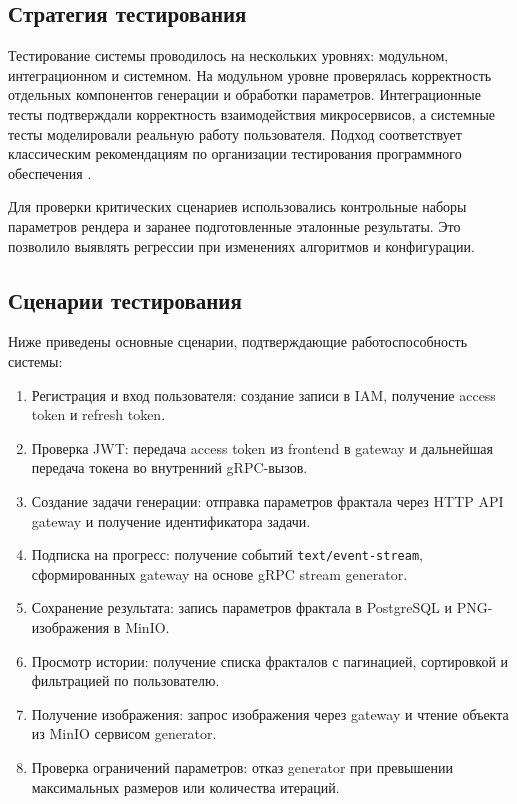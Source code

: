 \subsection{Стратегия тестирования}

Тестирование системы проводилось на нескольких уровнях: модульном, интеграционном и системном. На модульном уровне проверялась корректность отдельных компонентов генерации и обработки параметров. Интеграционные тесты подтверждали корректность взаимодействия микросервисов, а системные тесты моделировали реальную работу пользователя. Подход соответствует классическим рекомендациям по организации тестирования программного обеспечения \cite{testing_myers}.

Для проверки критических сценариев использовались контрольные наборы параметров рендера и заранее подготовленные эталонные результаты. Это позволило выявлять регрессии при изменениях алгоритмов и конфигурации.

\subsection{Сценарии тестирования}

Ниже приведены основные сценарии, подтверждающие работоспособность системы:
\begin{enumerate}
  \item Регистрация и вход пользователя: создание записи в IAM, получение access token и refresh token.
  \item Проверка JWT: передача access token из frontend в gateway и дальнейшая передача токена во внутренний gRPC-вызов.
  \item Создание задачи генерации: отправка параметров фрактала через HTTP API gateway и получение идентификатора задачи.
  \item Подписка на прогресс: получение событий \texttt{text/event-stream}, сформированных gateway на основе gRPC stream generator.
  \item Сохранение результата: запись параметров фрактала в PostgreSQL и PNG-изображения в MinIO.
  \item Просмотр истории: получение списка фракталов с пагинацией, сортировкой и фильтрацией по пользователю.
  \item Получение изображения: запрос изображения через gateway и чтение объекта из MinIO сервисом generator.
  \item Проверка ограничений параметров: отказ generator при превышении максимальных размеров или количества итераций.
\end{enumerate}

